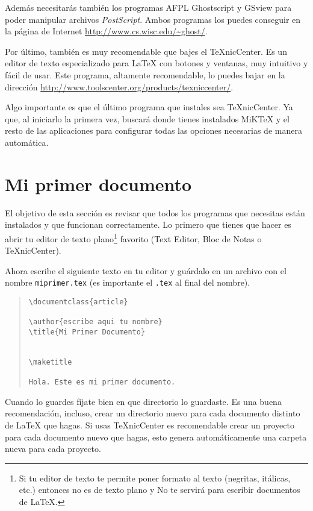 Adem\'as necesitar\'as tambi\'en los programas AFPL Ghostscript y GSview para
poder manipular archivos \emph{PostScript}. Ambos programas los puedes conseguir
en la p\'agina de Internet \url{http://www.cs.wisc.edu/~ghost/}.

Por \'ultimo, tambi\'en es muy recomendable que bajes el \TeX{}nicCenter.
Es un editor de texto especializado para \LaTeX{} con botones y ventanas,
muy intuitivo y f\'acil de usar. Este programa, altamente recomendable, lo puedes
bajar en la direcci\'on \url{http://www.toolscenter.org/products/texniccenter/}.

Algo importante es que el \'ultimo programa que instales sea \TeX{}nicCenter. Ya que,
al iniciarlo la primera vez, buscar\'a donde tienes instalados MiK\TeX{} y el
resto de las aplicaciones para configurar todas las opciones necesarias de
manera autom\'atica.



\section{Mi primer documento}\label{primer}

El objetivo de esta secci\'on es revisar que todos los programas que necesitas
est\'an instalados y que funcionan correctamente. Lo primero que tienes que
hacer es abrir tu editor de texto plano\footnote{Si tu editor de texto te permite
poner formato al texto (negritas, it\'alicas, etc.) entonces no es de texto
plano y No te servir\'a para escribir documentos de \LaTeX{}.} favorito (Text Editor,
Bloc de Notas o \TeX{}nicCenter).

Ahora escribe el siguiente texto en tu editor y gu\'ardalo en un archivo con el nombre \texttt{miprimer.tex} 
(es importante el \texttt{.tex} al final del nombre).

\begin{quote}
\begin{verbatim}
\documentclass{article}

\author{escribe aqui tu nombre}
\title{Mi Primer Documento}


\maketitle

Hola. Este es mi primer documento.

\end{verbatim}
\end{quote}

Cuando lo guardes f\'ijate bien en que directorio lo guardaste. Es una buena recomendaci\'on, incluso, crear un 
directorio nuevo para cada documento distinto de \LaTeX{} que hagas. Si usas \TeX{}nicCenter es recomendable crear 
un proyecto para cada documento nuevo que hagas, esto genera autom\'aticamente una carpeta nueva para cada proyecto.


